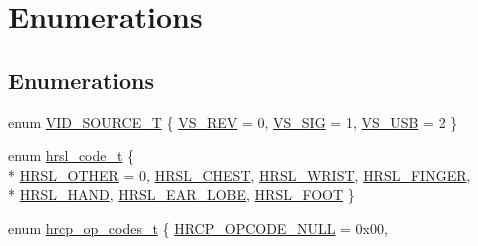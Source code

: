 \hypertarget{group___enumerations}{\section{Enumerations}
\label{group___enumerations}
}
\subsection*{Enumerations}
\begin{DoxyCompactItemize}
\item 
enum \hyperlink{group___enumerations_ga42b352f4817787f82d2adcffd4793ad9}{V\-I\-D\-\_\-\-S\-O\-U\-R\-C\-E\-\_\-\-T} \{ \hyperlink{group___enumerations_gga42b352f4817787f82d2adcffd4793ad9abb49a7689b3186fe7da6b61eeb6a207d}{V\-S\-\_\-\-R\-E\-V} = 0, 
\hyperlink{group___enumerations_gga42b352f4817787f82d2adcffd4793ad9aee983b596859c3b849a073596459d38c}{V\-S\-\_\-\-S\-I\-G} = 1, 
\hyperlink{group___enumerations_gga42b352f4817787f82d2adcffd4793ad9a704d8d311290a7c789e3902af79ae043}{V\-S\-\_\-\-U\-S\-B} = 2
 \}
\item 
enum \hyperlink{group___enumerations_ga142ef314a313f7071c544be2939c13a3}{hrsl\-\_\-code\-\_\-t} \{ \\*
\hyperlink{group___enumerations_gga142ef314a313f7071c544be2939c13a3a1fef127f1d4f2ed5625f5cf201319869}{H\-R\-S\-L\-\_\-\-O\-T\-H\-E\-R} = 0, 
\hyperlink{group___enumerations_gga142ef314a313f7071c544be2939c13a3a6646a23f8ba502cee080a9a747349dae}{H\-R\-S\-L\-\_\-\-C\-H\-E\-S\-T}, 
\hyperlink{group___enumerations_gga142ef314a313f7071c544be2939c13a3a69db22e836192e959df20b9d7e322460}{H\-R\-S\-L\-\_\-\-W\-R\-I\-S\-T}, 
\hyperlink{group___enumerations_gga142ef314a313f7071c544be2939c13a3a677a2bce35979f3240d4c031b4504b3e}{H\-R\-S\-L\-\_\-\-F\-I\-N\-G\-E\-R}, 
\\*
\hyperlink{group___enumerations_gga142ef314a313f7071c544be2939c13a3a374b43fb17807d51232d35ef7b53dd5f}{H\-R\-S\-L\-\_\-\-H\-A\-N\-D}, 
\hyperlink{group___enumerations_gga142ef314a313f7071c544be2939c13a3a500c23539eeecc80f5d0895db91dee94}{H\-R\-S\-L\-\_\-\-E\-A\-R\-\_\-\-L\-O\-B\-E}, 
\hyperlink{group___enumerations_gga142ef314a313f7071c544be2939c13a3a3d7f638193a65fda264d54f05ee0275f}{H\-R\-S\-L\-\_\-\-F\-O\-O\-T}
 \}
\item 
enum \hyperlink{group___enumerations_ga05f649a99eaf5a7d66679d1b1d30c2e3}{hrcp\-\_\-op\-\_\-codes\-\_\-t} \{ \hyperlink{group___enumerations_gga05f649a99eaf5a7d66679d1b1d30c2e3a6dc2044db07e52a55ab5d9b2f4b520ba}{H\-R\-C\-P\-\_\-\-O\-P\-C\-O\-D\-E\-\_\-\-N\-U\-L\-L} = 0x00, 

\end{DoxyCompactItemize}
